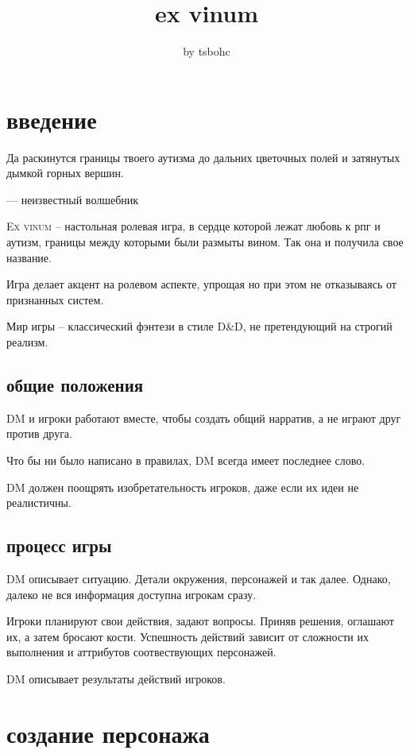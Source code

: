 \documentclass[a4paper,12pt,twocolumn]{book}
\title{\textbf{ex vinum}}
\author{by tsbohc}
\date{}
\begin{document}
\maketitle
\tableofcontents

\chapter{введение}

\epigraph{Да раскинутся границы твоего аутизма до дальних цветочных полей и затянутых дымкой горных вершин.}{--- неизвестный волшебник}

\lettrine[lines=2]{E}{x vinum} -- настольная ролевая игра, в сердце которой лежат любовь к рпг и аутизм, границы между которыми были размыты вином. Так она и получила свое название.

Игра делает акцент на ролевом аспекте, упрощая но при этом не отказываясь от признанных систем.

Мир игры -- классический фэнтези в стиле D\&D, не претендующий на строгий реализм.

\section{общие положения}

DM и игроки работают вместе, чтобы создать общий нарратив, а не играют друг против друга.

Что бы ни было написано в правилах, DM всегда имеет последнее слово.

DM должен поощрять изобретательность игроков, даже если их идеи не реалистичны.

\section{процесс игры}

DM описывает ситуацию. Детали окружения, персонажей и так далее. Однако, далеко не вся информация доступна игрокам сразу.

Игроки планируют свои действия, задают вопросы. Приняв решения, оглашают их, а затем бросают кости. Успешность действий зависит от сложности их выполнения и аттрибутов соотвествующих персонажей.

DM описывает результаты действий игроков.

\chapter{создание персонажа}
\end{document}
